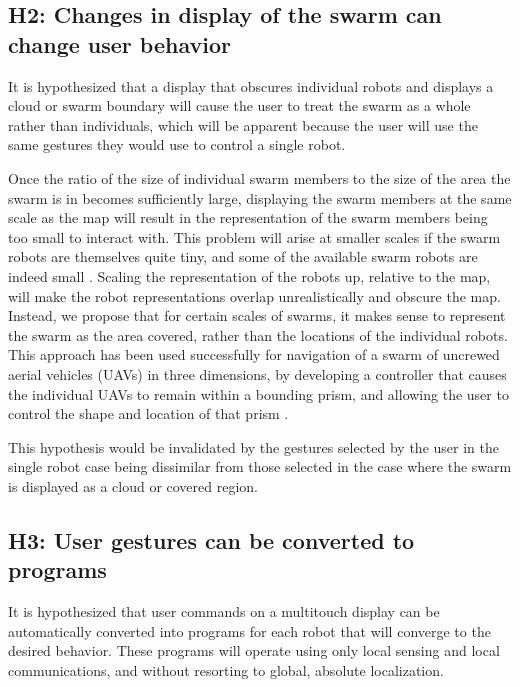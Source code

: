 \subsection{H2: Changes in display of the swarm can change user behavior}

It is hypothesized that a display that obscures individual robots and displays a cloud or swarm boundary will cause the user to treat the swarm as a whole rather than individuals, which will be apparent because the user will use the same gestures they would use to control a single robot. 

Once the ratio of the size of individual swarm members to the size of the area the swarm is in becomes sufficiently large, displaying the swarm members at the same scale as the map will result in the representation of the swarm members being too small to interact with. 
This problem will arise at smaller scales if the swarm robots are themselves quite tiny, and some of the available swarm robots are indeed small \citep{pelrine2012diamagnetically}.
Scaling the representation of the robots up, relative to the map, will make the robot representations overlap unrealistically and obscure the map. 
Instead, we propose that for certain scales of swarms, it makes sense to represent the swarm as the area covered, rather than the locations of the individual robots.
This approach has been used successfully for navigation of a swarm of uncrewed aerial vehicles (UAVs) in three dimensions, by developing a controller that causes the individual UAVs to remain within a bounding prism, and allowing the user to control the shape and location of that prism \citep{ayanian2014controlling}.

This hypothesis would be invalidated by the gestures selected by the user in the single robot case being dissimilar from those selected in the case where the swarm is displayed as a cloud or covered region. 

\subsection{H3: User gestures can be converted to programs}

It is hypothesized that user commands on a multitouch display can be automatically converted into programs for each robot that will converge to the desired behavior. These programs will operate using only local sensing and local communications, and without resorting to global, absolute localization. 

